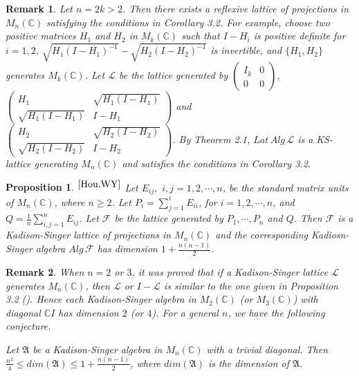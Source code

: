 \documentclass[12pt]{article}
\newtheorem{prop}{Proposition}[section]
\newtheorem{remark}{Remark}[section]
\newcommand{\AAA}{\mathfrak A} \newcommand{\TTT}{\mathfrak T}
\newcommand{\LLL}{\mathcal L} %
\newcommand{\FFF}{\mathcal F}
\newcommand{\C}{\mathbb C} %
\def\L{{\mathcal{L}}}
\begin{document}
{\begin{remark} Let $n=2k>2$. Then there exists a reflexive lattice of projections in $M_n(\C)$ satisfying the conditions in Corollary 3.2. For
example, choose two positive matrices $H_1$ and $H_2$ in $M_k(\C)$
such that $I-H_i$ is positive definite for $i=1,2$,
$\sqrt{H_{1}(I-H_{1})^{-1}}-\sqrt{H_{2}(I-H_{2})^{-1}}$ is
invertible, and $\{H_1,H_2\}$ generates $M_k(\C)$. Let $\LLL$ be the
lattice generated  by $\left(\begin{array}{cc} I_k & 0\\
0&0\end{array}\right)$, $\left(\begin{array}{cc} H_1 & \sqrt{H_1
(I-H_1)} \\ \sqrt{H_1 (I-H_1)} & I - H_1\end{array}\right)$ and $
\left(\begin{array}{cc} H_2 & \sqrt{H_2(I-H_2)} \\
\sqrt{H_2(I-H_2)} & I - H_2\end{array}\right)$.  By Theorem 2.1,
$Lat\,Alg\,\LLL$ is a KS-lattice generating $M_n(\C)$ and satisfies
the conditions in Corollary 3.2.
\end{remark}

\begin{prop}$^{\cite{Hou,WY}}$ Let $E_{ij},\,\, i,j=1,2,\cdots,n$, be the standard matrix units of
$M_n(\C)$, where $n\geq 2$. Let $P_i=\sum\limits_{j=1}^{i}E_{ii}$,
for $i=1,2,\cdots, n$, and $Q= \frac 1n\sum\limits_{i,j=1}^nE_{ij}$.
Let $\FFF$ be the lattice generated by  $P_1,\cdots,P_{n}$ and $Q$.
Then $\FFF$ is a Kadison-Singer lattice of projections in $M_n(\C)$
and the corresponding Kadiosn-Singer algebra $Alg\,\FFF$ has
dimension $1+\frac{n(n-1)}{2}$.
\end{prop}

\begin{remark} When $n=2$ or $3$, it was
proved that if a Kadison-Singer lattice $\L$ generates $M_n(\C)$,
then $\L$ or $I-\L$ is similar to the one given in Proposition 3.2
(\cite{Tan}). Hence each Kadison-Singer algebra in $M_2(\C)$ (or
$M_3(\C)$) with diagonal $\C I$ has dimension $2$ (or $4$). For a
general $n$, we have the following conjecture.

\vspace{2mm}

\quad Let $\AAA$  be a Kadison-Singer
algebra in $M_n(\C)$ with a trivial diagonal. Then
$\frac{n^2}{4}\leq dim(\AAA)\leq 1+\frac{n(n-1)}{2}$, where
$dim(\AAA)$ is the dimension of $\AAA$.
\end{remark}


}
\end{document}
